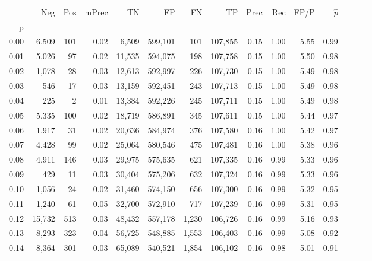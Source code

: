 \begin{tabular}{rrrrrrrrrrrrrrr}
\toprule
{} &     Neg &    Pos & mPrec &       TN &       FP &       FN &       TP &  Prec &   Rec &  FP/P & $\hat{p}$ \\
p    &         &        &       &          &          &          &          &       &       &       &           \\
\midrule
0.00 &   6,509 &    101 &  0.02 &    6,509 &  599,101 &      101 &  107,855 &  0.15 &  1.00 &  5.55 &      0.99 \\
0.01 &   5,026 &     97 &  0.02 &   11,535 &  594,075 &      198 &  107,758 &  0.15 &  1.00 &  5.50 &      0.98 \\
0.02 &   1,078 &     28 &  0.03 &   12,613 &  592,997 &      226 &  107,730 &  0.15 &  1.00 &  5.49 &      0.98 \\
0.03 &     546 &     17 &  0.03 &   13,159 &  592,451 &      243 &  107,713 &  0.15 &  1.00 &  5.49 &      0.98 \\
0.04 &     225 &      2 &  0.01 &   13,384 &  592,226 &      245 &  107,711 &  0.15 &  1.00 &  5.49 &      0.98 \\
0.05 &   5,335 &    100 &  0.02 &   18,719 &  586,891 &      345 &  107,611 &  0.15 &  1.00 &  5.44 &      0.97 \\
0.06 &   1,917 &     31 &  0.02 &   20,636 &  584,974 &      376 &  107,580 &  0.16 &  1.00 &  5.42 &      0.97 \\
0.07 &   4,428 &     99 &  0.02 &   25,064 &  580,546 &      475 &  107,481 &  0.16 &  1.00 &  5.38 &      0.96 \\
0.08 &   4,911 &    146 &  0.03 &   29,975 &  575,635 &      621 &  107,335 &  0.16 &  0.99 &  5.33 &      0.96 \\
0.09 &     429 &     11 &  0.03 &   30,404 &  575,206 &      632 &  107,324 &  0.16 &  0.99 &  5.33 &      0.96 \\
0.10 &   1,056 &     24 &  0.02 &   31,460 &  574,150 &      656 &  107,300 &  0.16 &  0.99 &  5.32 &      0.95 \\
0.11 &   1,240 &     61 &  0.05 &   32,700 &  572,910 &      717 &  107,239 &  0.16 &  0.99 &  5.31 &      0.95 \\
0.12 &  15,732 &    513 &  0.03 &   48,432 &  557,178 &    1,230 &  106,726 &  0.16 &  0.99 &  5.16 &      0.93 \\
0.13 &   8,293 &    323 &  0.04 &   56,725 &  548,885 &    1,553 &  106,403 &  0.16 &  0.99 &  5.08 &      0.92 \\
0.14 &   8,364 &    301 &  0.03 &   65,089 &  540,521 &    1,854 &  106,102 &  0.16 &  0.98 &  5.01 &      0.91 \\

\end{tabular}
